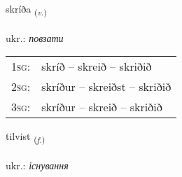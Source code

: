 \documentclass[frontgrid, backgrid]{flacards}\usepackage[]{graphicx}\usepackage[]{xcolor}
\begin{document}
\renewcommand{\blhead}{\vskip5pt {\small\bfseries\footnotesize Sagnorð | дієслово }}
\renewcommand{\bcfoot}{\vskip5pt \hspace{2pt}{\small\bfseries\footnotesize 3K}}


{skríða \small{\textsubscript{(\textit{v.})}} \\[1ex] %
\textphonetic{[skriːða]} \\
ukr.: \emph{повзати} \\  [2ex]
\renewcommand*{\arraystretch}{0.8}
\begin{tabular}{p{1cm}l}
\textsc{1sg}: & skríð -- skreið -- skriðið \\ 
\textsc{2sg}: & skríður -- skreiðst -- skriðið \\ 
\textsc{3sg}: & skríður -- skreið -- skriðið \\ 
\end{tabular}
}

\renewcommand{\flhead}{\vskip5pt \fboxsep=0pt {\small\bfseries\footnotesize Nafnorð | іменник}}
\renewcommand{\fcfoot}{\vskip5pt \fboxsep=0pt \hspace{2pt}{\small\bfseries\footnotesize 3K}}

\renewcommand{\blhead}{\vskip5pt {\small\bfseries\footnotesize Nafnorð | іменник }}
\renewcommand{\bcfoot}{\vskip5pt \hspace{2pt}{\small\bfseries\footnotesize 3K}}


{tilvist \small{\textsubscript{(\textit{f.})}} \\[1ex] %
\textphonetic{[tʰɪlvɪst]} \\
ukr.: \emph{існування} \\  [2ex]
\renewcommand*{\arraystretch}{0.8}
}

\renewcommand{\flhead}{\vskip5pt \fboxsep=0pt {\small\bfseries\footnotesize Nafnorð | іменник}}
\renewcommand{\fcfoot}{\vskip5pt \fboxsep=0pt \hspace{2pt}{\small\bfseries\footnotesize 3K}}
\end{document}
